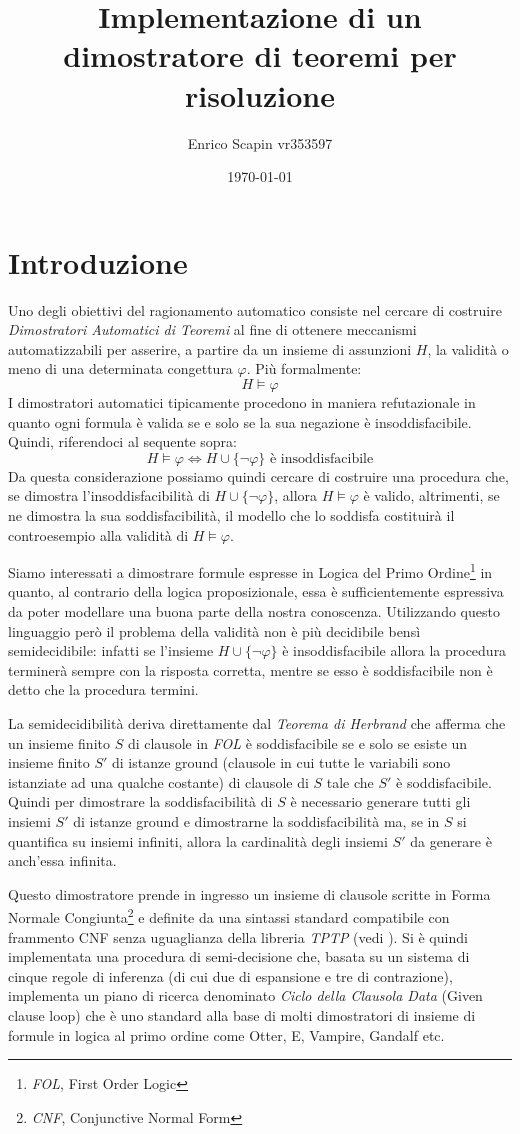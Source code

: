 \documentclass[a4paper,11pt]{article}
\title{\bf{Implementazione di un dimostratore di teoremi per risoluzione}}
\author{Enrico Scapin vr353597}
\date{\today}
\begin{document}
\maketitle

\small
\section{Introduzione}
Uno degli obiettivi del ragionamento automatico consiste nel cercare di costruire \emph{Dimostratori Automatici di Teoremi} al fine di ottenere meccanismi automatizzabili per asserire, a partire da un insieme di assunzioni $H$, la validità o meno di una determinata congettura $\varphi$. Più formalmente:
\[ H \models \varphi \]
I dimostratori automatici tipicamente procedono in maniera refutazionale in quanto ogni formula è valida se e solo se la sua negazione è insoddisfacibile. Quindi, riferendoci al sequente sopra:
\[ H \models \varphi \Longleftrightarrow H \cup \lbrace\neg \varphi\rbrace \text{ è insoddisfacibile} \]
Da questa considerazione possiamo quindi cercare di costruire una procedura che, se dimostra l'insoddisfacibilità di $H \cup \lbrace\neg \varphi\rbrace$, allora $ H \models \varphi $ è valido, altrimenti, se ne dimostra la sua soddisfacibilità, il modello che lo soddisfa costituirà il controesempio alla validità di $ H \models \varphi $.\par
Siamo interessati a dimostrare formule espresse in Logica del Primo Ordine\footnote{\emph{FOL}, First Order Logic} in quanto, al contrario della logica proposizionale, essa è sufficientemente espressiva da poter modellare una buona parte della nostra conoscenza. Utilizzando questo linguaggio però il problema della validità non è più decidibile bensì semidecidibile: infatti se l'insieme $H \cup \lbrace\neg \varphi\rbrace $ è insoddisfacibile allora la procedura terminerà sempre con la risposta corretta, mentre se esso è soddisfacibile non è detto che la procedura termini. \par
La semidecidibilità deriva direttamente dal \emph{Teorema di Herbrand} che afferma che un insieme finito $S$ di clausole in \emph{FOL} è soddisfacibile se e solo se esiste un insieme finito $S'$ di istanze ground (clausole in cui tutte le variabili sono istanziate ad una qualche costante) di clausole di $S$ tale che $S'$ è soddisfacibile. Quindi per dimostrare la soddisfacibilità di $S$ è necessario generare tutti gli insiemi $S'$ di istanze ground e dimostrarne la soddisfacibilità ma, se in $S$ si quantifica su insiemi infiniti, allora la cardinalità degli insiemi $S'$ da generare è anch'essa infinita.\par
Questo dimostratore prende in ingresso un insieme di clausole scritte in Forma Normale Congiunta\footnote{\emph{CNF}, Conjunctive Normal Form} e definite da una sintassi standard compatibile con frammento CNF senza uguaglianza della libreria \emph{TPTP} (vedi \cite{TPTP}). Si è quindi implementata una procedura di semi-decisione che, basata su un sistema di cinque regole di inferenza (di cui due di espansione e tre di contrazione), implementa un piano di ricerca denominato \emph{Ciclo della Clausola Data} (Given clause loop) che è uno standard alla base di molti dimostratori di insieme di formule in logica al primo ordine come Otter, E, Vampire, Gandalf etc.
\end{document}
